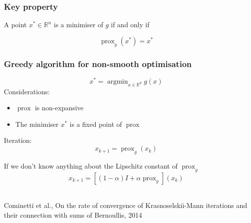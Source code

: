\documentclass[aspectratio=169]{beamer}
\DeclareMathOperator{\Prox}{prox}
\newcommand{\prox}[2]{\Prox_{#1}\left({#2}\right)}
\newcommand{\RR}{\mathbb{R}}
\newcommand{\rd}{\mathbb{R}^d}
\newcommand{\normtwosq}[1]{\left\|#1\right\|_2^2}
\DeclareMathOperator*{\argmin}{argmin}
\begin{document}
		
		\begin{frame}
		\frametitle{Key property}
		\begin{center}
		A point $x^*\in \RR^n$ is a minimiser of $g$ if and only if 
		\end{center}
		\begin{equation}
		\nonumber \prox{g}{x^*} = x^*
		\end{equation}
		\end{frame}
		
		\begin{frame}
		\frametitle{Greedy algorithm for non-smooth optimisation}
		\begin{equation}
		\nonumber x^* = \argmin_{x\in \rd} g(x)
		\end{equation}
		\pause
		Considerations:
		\begin{itemize}
		\pause\item $\Prox$ is non-expansive
		\pause\item The minimiser $x^*$ is a fixed point of $\Prox$
		\end{itemize}
		\pause
		Iteration:
		\begin{equation}\nonumber
		x_{k+1} = \prox{g}{x_k}
		\end{equation}
		
		\pause
		If we don't know anything about the Lipschitz constant of $\Prox_g$
		\begin{equation}
		\nonumber x_{k+1} = [(1-\alpha)I + \alpha\Prox_g](x_k)
		\end{equation}
		\quad \\
		\begin{center}
		\textcolor{ExecusharesGrey}{\tiny Cominetti et al., On the rate of convergence of Krasnoselskii-Mann iterations and their connection with sums of Bernoullis, 2014}
		\end{center}
		\end{frame}
		
		
\end{document}
